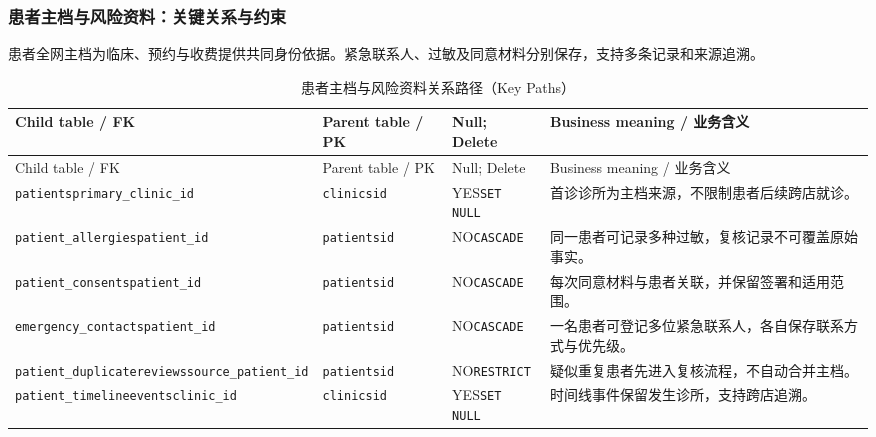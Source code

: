 \subsubsection{患者主档与风险资料：关键关系与约束}
患者全网主档为临床、预约与收费提供共同身份依据。紧急联系人、过敏及同意材料分别保存，支持多条记录和来源追溯。

\begingroup\footnotesize\setlength{\tabcolsep}{3pt}
\begin{longtable}{@{}L{43mm}L{32mm}L{24mm}L{49mm}@{}}
\caption{患者主档与风险资料关系路径（Key Paths）}\label{tab:domain-key-03}\\\toprule
Child table / FK & Parent table / PK & Null; Delete & Business meaning / 业务含义\\\midrule\endfirsthead
\toprule Child table / FK & Parent table / PK & Null; Delete & Business meaning / 业务含义\\\midrule\endhead
\texttt{patients}\newline\texttt{primary\_clinic\_id} & \texttt{clinics}\newline\texttt{id} & YES\newline\texttt{SET NULL} & 首诊诊所为主档来源，不限制患者后续跨店就诊。\\
\texttt{patient\_allergies}\newline\texttt{patient\_id} & \texttt{patients}\newline\texttt{id} & NO\newline\texttt{CASCADE} & 同一患者可记录多种过敏，复核记录不可覆盖原始事实。\\
\texttt{patient\_consents}\newline\texttt{patient\_id} & \texttt{patients}\newline\texttt{id} & NO\newline\texttt{CASCADE} & 每次同意材料与患者关联，并保留签署和适用范围。\\
\texttt{emergency\_contacts}\newline\texttt{patient\_id} & \texttt{patients}\newline\texttt{id} & NO\newline\texttt{CASCADE} & 一名患者可登记多位紧急联系人，各自保存联系方式与优先级。\\
\texttt{patient\_duplicate}\newline\texttt{reviews}\newline\texttt{source\_patient\_id} & \texttt{patients}\newline\texttt{id} & NO\newline\texttt{RESTRICT} & 疑似重复患者先进入复核流程，不自动合并主档。\\
\texttt{patient\_timeline}\newline\texttt{events}\newline\texttt{clinic\_id} & \texttt{clinics}\newline\texttt{id} & YES\newline\texttt{SET NULL} & 时间线事件保留发生诊所，支持跨店追溯。\\
\bottomrule\end{longtable}\endgroup


